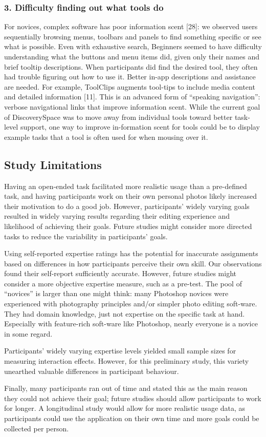 \subsubsection{3. Difficulty finding out what tools do}
For novices, complex software has poor information scent [28]: we observed users sequentially browsing menus, toolbars and panels to find something specific or see what is possible. Even with exhaustive search, Beginners seemed to have difficulty understanding what the buttons and menu items did, given only their names and brief tooltip descriptions. When participants did find the desired tool, they often had trouble figuring out how to use it. Better in-app descriptions and assistance are needed. For example, ToolClips augments tool-tips to include media content and detailed information [11]. This is an advanced form of ``speaking navigation'': verbose navigational links that improve information scent. While the current goal of Discovery\-Space was to move away from individual tools toward better task-level support, one way to improve in-formation scent for tools could be to display example tasks that a tool is often used for when mousing over it.

\subsection{Study Limitations}
Having an open-ended task facilitated more realistic usage than a pre-defined task, and having participants work on their own personal photos likely increased their motivation to do a good job. However, participants' widely varying goals resulted in widely varying results regarding their editing experience and likelihood of achieving their goals. Future studies might consider more directed tasks to reduce the variability in participants' goals. 

Using self-reported expertise ratings has the potential for inaccurate assignments based on differences in how participants perceive their own skill. Our observations found their self-report sufficiently accurate. However, future studies might consider a more objective expertise measure, such as a pre-test. The pool of ``novices'' is larger than one might think: many Photoshop novices were experienced with photography principles and/or simpler photo editing soft-ware. They had domain knowledge, just not expertise on the specific task at hand. Especially with feature-rich soft-ware like Photoshop, nearly everyone is a novice in some regard. 

Participants' widely varying expertise levels yielded small sample sizes for measuring interaction effects. However, for this preliminary study, this variety unearthed valuable differences in participant behaviour. 

Finally, many participants ran out of time and stated this as the main reason they could not achieve their goal; future studies should allow participants to work for longer. A longitudinal study would allow for more realistic usage data, as participants could use the application on their own time and more goals could be collected per person. 

